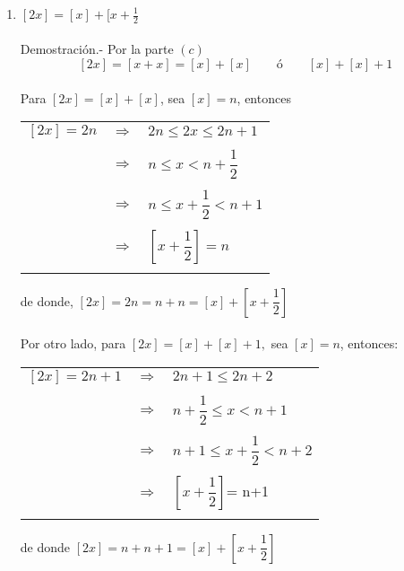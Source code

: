 \begin{enumerate}
\begin{enumerate}[\bfseries (a)]
	    \item  $[2x] = [x] + [x + \frac{1}{2}$\\\\
		Demostración.-\; Por la parte $(c)$  $$[2x]=[x+x] = [x] + [x] \qquad ó \qquad [x]+[x]+1$$ \\
		Para $[2x] = [x] + [x]$, sea $[x]=n$, entonces 
		\begin{center}
		    \begin{tabular}{rcl}
			$[2x]=2n$&$\Longrightarrow$&$2n\leq 2x \leq 2n+1$\\\\
			&$\Longrightarrow$&$n\leq x < n + \dfrac{1}{2}$\\\\
			&$\Longrightarrow$&$n \leq x + \dfrac{1}{2}<n+1$\\\\
			&$\Longrightarrow$&$\left[x + \dfrac{1}{2}\right] = n$\\\\
		    \end{tabular}
		\end{center}
		de donde, $[2x]=2n=n+n=[x]+\left[x + \dfrac{1}{2}\right]$\\\\

		Por otro lado, para $[2x] = [x] + [x] + 1,$ sea $[x]=n$, entonces:
		\begin{center}
		    \begin{tabular}{rcl}
			$[2x]=2n+1$&$\Longrightarrow$&$2n+1 \leq 2n + 2$\\\\
			&$\Longrightarrow$&$n+\dfrac{1}{2}\leq x < n+1$\\\\
			&$\Longrightarrow$&$n+1 \leq x+\dfrac{1}{2} < n+2$\\\\
			&$\Longrightarrow$&$\left[x+ \dfrac{1}{2}\right]$= n+1\\\\
		    \end{tabular}
		\end{center}
		de donde $[2x]=n+n+1=[x]+\left[x+\dfrac{1}{2}\right]$\\\\


\end{enumerate}
\end{enumerate}
